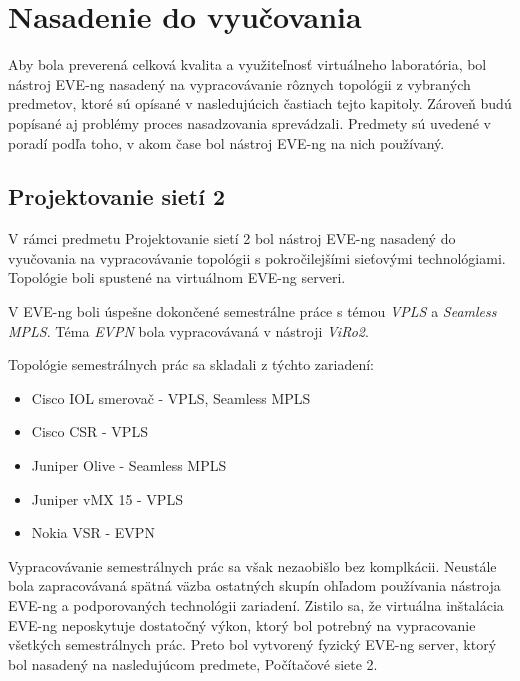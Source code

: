 \chapter{Nasadenie do vyučovania}
\label{chap:nasadenie_do_vyucovania}

Aby bola preverená celková kvalita a využiteľnosť virtuálneho laboratória, bol nástroj EVE-ng nasadený na vypracovávanie rôznych topológii z vybraných predmetov, ktoré sú opísané v nasledujúcich častiach tejto kapitoly. Zároveň budú popísané aj problémy proces nasadzovania sprevádzali. Predmety sú uvedené v poradí podľa toho, v akom čase bol nástroj EVE-ng na nich používaný.





\section{Projektovanie sietí 2}

V rámci predmetu Projektovanie sietí 2 bol nástroj EVE-ng nasadený do vyučovania na vypracovávanie topológii s pokročilejšími sieťovými technológiami. Topológie boli spustené na virtuálnom EVE-ng serveri.

V EVE-ng boli úspešne dokončené semestrálne práce s témou \emph{VPLS} a \emph{Seamless MPLS}. Téma \emph{EVPN} bola vypracovávaná v nástroji \emph{ViRo2}.

Topológie semestrálnych prác sa skladali z týchto zariadení:

\begin{itemize}[noitemsep]
    \item Cisco IOL smerovač - VPLS, Seamless MPLS
    \item Cisco CSR - VPLS
    \item Juniper Olive - Seamless MPLS
    \item Juniper vMX 15 - VPLS
    \item Nokia VSR - EVPN
\end{itemize}

Vypracovávanie semestrálnych prác sa však nezaobišlo bez komplkácii. Neustále bola zapracovávaná spätná väzba ostatných skupín ohľadom používania nástroja EVE-ng a podporovaných technológii zariadení. Zistilo sa, že virtuálna inštalácia EVE-ng neposkytuje dostatočný výkon, ktorý bol potrebný na vypracovanie všetkých semestrálnych prác. Preto bol vytvorený fyzický EVE-ng server, ktorý bol nasadený na nasledujúcom predmete, Počítačové siete 2.





